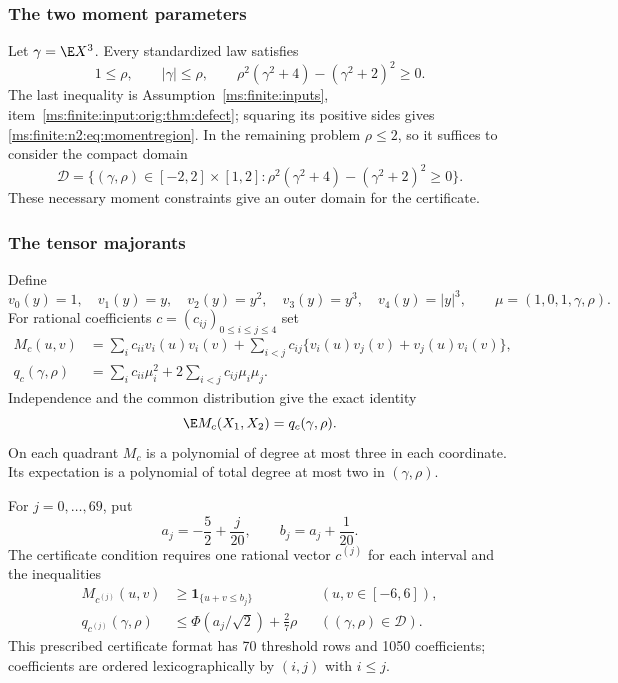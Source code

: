 \subsubsection{The two moment parameters}
Let $\gamma=\E X^3$. Every standardized law satisfies
\begin{equation}\label{ms:finite:n2:eq:momentregion}
 1\le\rho,\qquad |\gamma|\le\rho,\qquad
 \rho^2(\gamma^2+4)-(\gamma^2+2)^2\ge0.
\end{equation}
The last inequality is Assumption~\ref{ms:finite:inputs}, item~\ref{ms:finite:input:orig:thm:defect}; squaring its positive
sides gives \eqref{ms:finite:n2:eq:momentregion}. In the remaining problem $\rho\le2$,
so it suffices to consider the compact domain
\begin{equation}\label{ms:finite:n2:eq:D}
 \mathcal D=\{(\gamma,\rho)\in[-2,2]\times[1,2]:
 \rho^2(\gamma^2+4)-(\gamma^2+2)^2\ge0\}.
\end{equation}
These necessary moment constraints give an outer domain for the certificate.

\subsubsection{The tensor majorants}
Define
\[
 v_0(y)=1,\quad v_1(y)=y,\quad v_2(y)=y^2,
 \quad v_3(y)=y^3,\quad v_4(y)=|y|^3,
 \qquad \mu=(1,0,1,\gamma,\rho).
\]
For rational coefficients $c=(c_{ij})_{0\le i\le j\le4}$ set
\begin{align}
 M_c(u,v)&=\sum_i c_{ii}v_i(u)v_i(v)
 +\sum_{i<j}c_{ij}\{v_i(u)v_j(v)+v_j(u)v_i(v)\},\label{ms:finite:n2:eq:tensor}\\
 q_c(\gamma,\rho)&=\sum_i c_{ii}\mu_i^2
                 +2\sum_{i<j}c_{ij}\mu_i\mu_j.\label{ms:finite:n2:eq:expect}
\end{align}
Independence and the common distribution give the exact identity
\begin{equation}\label{ms:finite:n2:eq:factor}
                      \E M_c(X_1,X_2)=q_c(\gamma,\rho).
\end{equation}
On each quadrant $M_c$ is a polynomial of degree at most three in each
coordinate. Its expectation is a polynomial of total degree at most two
in $(\gamma,\rho)$.

For $j=0,\ldots,69$, put
\[
 a_j=-\frac52+\frac j{20},\qquad b_j=a_j+\frac1{20}.
\]
The certificate condition requires one rational vector $c^{(j)}$ for each interval and the inequalities
\begin{align}
 M_{c^{(j)}}(u,v)&\ge\mathbf1_{\{u+v\le b_j\}}
                 &&(u,v\in[-6,6]),\label{ms:finite:n2:eq:C1}\\
 q_{c^{(j)}}(\gamma,\rho)&\le\Phi(a_j/\sqrt2)+\frac27\rho
                 &&((\gamma,\rho)\in\mathcal D).\label{ms:finite:n2:eq:C2}
\end{align}
This prescribed certificate format has 70 threshold rows and 1050 coefficients;
coefficients are ordered lexicographically by $(i,j)$ with $i\le j$.

